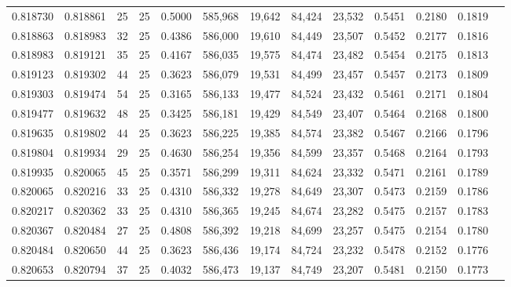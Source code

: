 \begin{tabular}{rrrrrrrrrrrrr}
0.818730 & 0.818861 &    25 &  25 &                                     0.5000 & 585,968 &  19,642 &  84,424 &  23,532 & 0.5451 & 0.2180 & 0.1819 \\
0.818863 & 0.818983 &    32 &  25 &                                     0.4386 & 586,000 &  19,610 &  84,449 &  23,507 & 0.5452 & 0.2177 & 0.1816 \\
0.818983 & 0.819121 &    35 &  25 &                                     0.4167 & 586,035 &  19,575 &  84,474 &  23,482 & 0.5454 & 0.2175 & 0.1813 \\
0.819123 & 0.819302 &    44 &  25 &                                     0.3623 & 586,079 &  19,531 &  84,499 &  23,457 & 0.5457 & 0.2173 & 0.1809 \\
0.819303 & 0.819474 &    54 &  25 &                                     0.3165 & 586,133 &  19,477 &  84,524 &  23,432 & 0.5461 & 0.2171 & 0.1804 \\
0.819477 & 0.819632 &    48 &  25 &                                     0.3425 & 586,181 &  19,429 &  84,549 &  23,407 & 0.5464 & 0.2168 & 0.1800 \\
0.819635 & 0.819802 &    44 &  25 &                                     0.3623 & 586,225 &  19,385 &  84,574 &  23,382 & 0.5467 & 0.2166 & 0.1796 \\
0.819804 & 0.819934 &    29 &  25 &                                     0.4630 & 586,254 &  19,356 &  84,599 &  23,357 & 0.5468 & 0.2164 & 0.1793 \\
0.819935 & 0.820065 &    45 &  25 &                                     0.3571 & 586,299 &  19,311 &  84,624 &  23,332 & 0.5471 & 0.2161 & 0.1789 \\
0.820065 & 0.820216 &    33 &  25 &                                     0.4310 & 586,332 &  19,278 &  84,649 &  23,307 & 0.5473 & 0.2159 & 0.1786 \\
0.820217 & 0.820362 &    33 &  25 &                                     0.4310 & 586,365 &  19,245 &  84,674 &  23,282 & 0.5475 & 0.2157 & 0.1783 \\
0.820367 & 0.820484 &    27 &  25 &                                     0.4808 & 586,392 &  19,218 &  84,699 &  23,257 & 0.5475 & 0.2154 & 0.1780 \\
0.820484 & 0.820650 &    44 &  25 &                                     0.3623 & 586,436 &  19,174 &  84,724 &  23,232 & 0.5478 & 0.2152 & 0.1776 \\
0.820653 & 0.820794 &    37 &  25 &                                     0.4032 & 586,473 &  19,137 &  84,749 &  23,207 & 0.5481 & 0.2150 & 0.1773 \\

\end{tabular}
